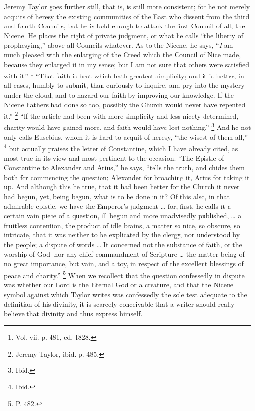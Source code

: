 Jeremy Taylor goes further still, that is, is still more
consistent; for he not merely acquits of heresy the existing
communities of the East who dissent from the third and fourth
Councils, but he is bold enough to attack the first Council of all,
the Nicene. He places the right of private judgment, or what he calls
``the liberty of prophesying,'' above all Councils whatever.
As to the Nicene, he says, ``\emph{I} am much pleased with the enlarging
of the Creed which the Council of Nice made, because they enlarged it
in my sense; but I am not sure that others were satisfied with
it.'' \footnote{Vol. vii. p. 481, ed. 1828.} ``That
faith is best which hath greatest simplicity; and it is better, in all
cases, humbly to submit, than curiously to inquire, and pry into the
mystery under the cloud, and to hazard our faith by improving our
knowledge. If the Nicene Fathers had done so too, possibly the Church
would never have repented it.'' \footnote{Jeremy Taylor, ibid. p. 485.} ``If the article had been with more simplicity and less nicety
determined, charity would have gained more, and faith would have lost
nothing.'' \footnote{Ibid.} And he
not only calls Eusebius, whom it is hard to acquit of heresy,
``the wisest of them all,'' \footnote{Ibid.} but actually praises the letter of Constantine, which I have
already cited, as most true in its view and most pertinent to the
occasion. ``The Epistle of Constantine to Alexander and Arius,''
he says, ``tells the truth, and chides them both for commencing
the question; Alexander for broaching it, Arius for taking it up. And
although this be true, that it had been better for the Church it never
had begun, yet, being begun, what is to be done in it? Of this also,
in that admirable epistle, we have the Emperor's judgment … for,
first, he calls it a certain vain piece of a question, ill begun and
more unadvisedly published, … a fruitless contention, the product of
idle brains, a matter so nice, so obscure, so intricate, that it was
neither to be explicated by the clergy, nor understood by the people;
a dispute of words … It concerned not the substance of faith, or the
worship of God, nor any chief commandment of Scripture … the matter
being of no great importance, but vain, and a toy, in respect of the
excellent blessings of peace and charity.'' \footnote{P. 482.} When we recollect that the question confessedly in dispute
was whether our Lord is the Eternal God or a creature, and that the
Nicene symbol against which Taylor writes was confessedly the sole
test adequate to the definition of his divinity, it is scarcely
conceivable that a writer should really believe that divinity and thus
express himself.

